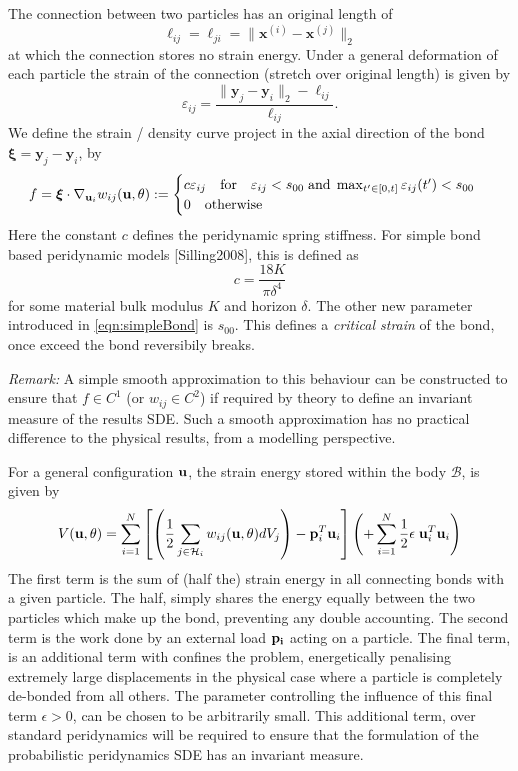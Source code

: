 \documentclass{article}
\begin{document}
\noindent
The connection between two particles has an original length of
\begin{equation}
\ell_{ij} = \ell_{ji} = \| \textbf{x}^{(i)} - \textbf{x}^{(j)} \|_2
\end{equation}
at which the connection stores no strain energy. Under a general deformation of each particle the strain of the connection (stretch over original length) is given by
$$
\varepsilon_{ij} = \frac{\| \textbf{y}_j - \textbf{y}_i\|_2 - \ell_{ij}}{\ell_{ij}}.
$$
We define the strain /  density curve project in the axial direction of the bond $\boldsymbol{\xi} = \textbf{y}_j - \textbf{y}_i$, by
\begin{equation}\label{eqn:simpleBond}
f = \boldsymbol{\xi} \cdot \nabla_{{\bf u}_i}w_{ij}({\bf u},\theta) :=
\begin{cases}
 c \varepsilon_{ij} \quad \mbox{for} \quad \varepsilon_{ij} < s_{00} \; \mbox{and} \; \max_{t' \in [0,t]} \varepsilon_{ij}(t') < s_{00}  \\
 0 \quad \mbox{otherwise}
\end{cases}
\end{equation}
Here the constant $c$ defines the peridynamic spring stiffness. For simple bond based peridynamic models [Silling2008], this is defined as
$$
c = \frac{18 K}{\pi \delta^4}
$$
for some material bulk modulus $K$ and horizon $\delta$. The other new parameter introduced in \eqref{eqn:simpleBond} is $s_{00}$. This defines a {\em critical strain} of the bond, once exceed the bond reversibily breaks.

{\em Remark:} A simple smooth approximation to this behaviour can be constructed to ensure that $f \in C^1$ (or $w_{ij} \in C^2$) if required by theory to define an invariant measure of the results SDE. Such a smooth approximation has no practical difference to the physical results, from a modelling perspective.

\smallskip
For a general configuration ${\bf u}$, the strain energy stored within the body $\mathcal B$, is given by
\begin{equation}\label{eqn:strainEnergy}
V({\bf u},\theta) = \sum_{i=1}^N \left[\left(\frac{1}{2}\sum_{j \in \mathcal H_i} w_{ij}({\bf u},\theta)dV_j \right) - {\bf p}_i^T{\bf u}_i\right] \left( + \sum_{i=1}^N \frac{1}{2}\epsilon\; {\bf u}_i^T{\bf u}_{i} \right)
\end{equation}
The first term is the sum of (half the) strain energy in all connecting bonds with a given particle. The half, simply shares the energy equally between the two particles which make up the bond, preventing any double accounting. The second term is the work done by an external load $\bf{p}_i$ acting on a particle. The final term, is an additional term with confines the problem, energetically penalising extremely large displacements in the physical case where a particle is completely de-bonded from all others. The parameter controlling the influence of this final term $\epsilon > 0$, can be chosen to be arbitrarily small. This additional term, over standard peridynamics will be required to ensure that the formulation of the probabilistic peridynamics SDE has an invariant measure.
\end{document}
